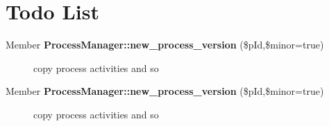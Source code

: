 \section{Todo List}\label{todo}
\label{_todo000002}
 \begin{description}
\item[Member {\bf Process\-Manager::new\_\-process\_\-version} (\$p\-Id,\$minor=true) ]copy process activities and so \end{description}


\label{_todo000001}
 \begin{description}
\item[Member {\bf Process\-Manager::new\_\-process\_\-version} (\$p\-Id,\$minor=true) ]copy process activities and so \end{description}
